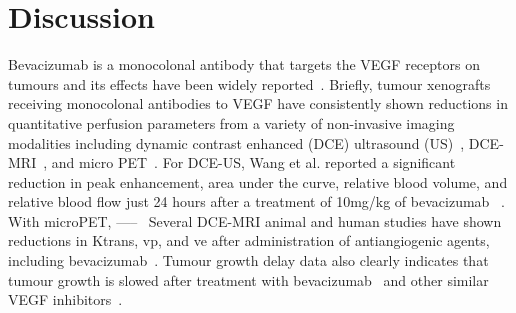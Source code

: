 



\newpage

\section{Discussion}

Bevacizumab is a monocolonal antibody that targets the VEGF receptors on tumours and its effects have been widely reported~\cite{refs}.
Briefly, tumour xenografts receiving monocolonal antibodies to VEGF have consistently shown reductions in quantitative perfusion parameters from a variety of non-invasive imaging modalities including dynamic contrast enhanced (DCE) ultrasound (US)~\cite{Wang:2015bb}, DCE-MRI~\cite{OConnor:2009cg}, and micro PET~\cite{Nagengast:2007hx}.
For DCE-US, Wang et al. reported a significant reduction in peak enhancement, area under the curve, relative blood volume, and relative blood flow just 24 hours after a treatment of 10mg/kg of bevacizumab~\cite{Wang:2015bb} .  
With microPET, -----~
Several DCE-MRI animal and human studies have shown reductions in Ktrans, vp, and ve after administration of antiangiogenic agents, including bevacizumab~\cite{mri}. 
Tumour growth delay data also clearly indicates that tumour growth is slowed after treatment with bevacizumab~\cite{growthdelay:junyang} and other similar VEGF inhibitors~\cite{sunitinib}.

